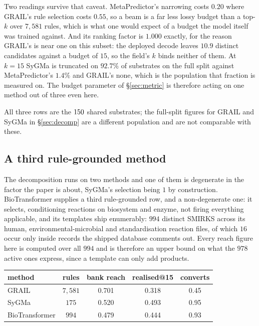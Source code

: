 Two readings survive that caveat. MetaPredictor's narrowing costs $0.20$ where GRAIL's rule
selection costs $0.55$, so a beam is a far less lossy budget than a top-$k$ over $7{,}581$ rules, which is what one would expect of a budget the model itself was trained against. And its ranking
factor is $1.000$ exactly, for the reason GRAIL's is near one on this subset: the deployed decode
leaves $10.9$ distinct candidates against a budget of $15$, so the field's $k$ binds neither of
them. At $k=15$ SyGMa is truncated on $92.7\%$ of substrates on the full split against MetaPredictor's $1.4\%$ and GRAIL's none, which is the
population that fraction is measured on. The budget parameter of
\S\ref{sec:metric} is therefore acting on one method out of three even here.

All three rows are the $150$ shared substrates; the full-split figures for GRAIL and SyGMa in
\S\ref{sec:decomp} are a different population and are not comparable with these.

\subsection{A third rule-grounded method}
\label{app:third}

The decomposition runs on two methods and one of them is degenerate in the factor the paper is
about, SyGMa's selection being $1$ by construction. BioTransformer supplies a third rule-grounded
row, and a non-degenerate one: it selects, conditioning reactions on biosystem and enzyme, not firing
everything applicable, and its templates ship enumerably: $994$ distinct SMIRKS across its
human, environmental-microbial and standardisation reaction files, of which $16$ occur only inside
records the shipped database comments out. Every reach figure here is computed over all $994$ and is
therefore an upper bound on what the $978$ active ones express, since a template can only add
products.

\begin{center}
\begin{tabular}{lcccc}
\toprule
method & rules & bank reach & realised@15 & converts \\
\midrule
GRAIL          & $7{,}581$ & 0.701 & 0.318 & 0.45 \\
SyGMa          & $175$ & 0.520 & 0.493 & 0.95 \\
BioTransformer & $994$     & 0.479 & 0.444 & 0.93 \\
\bottomrule
\end{tabular}
\end{center}

